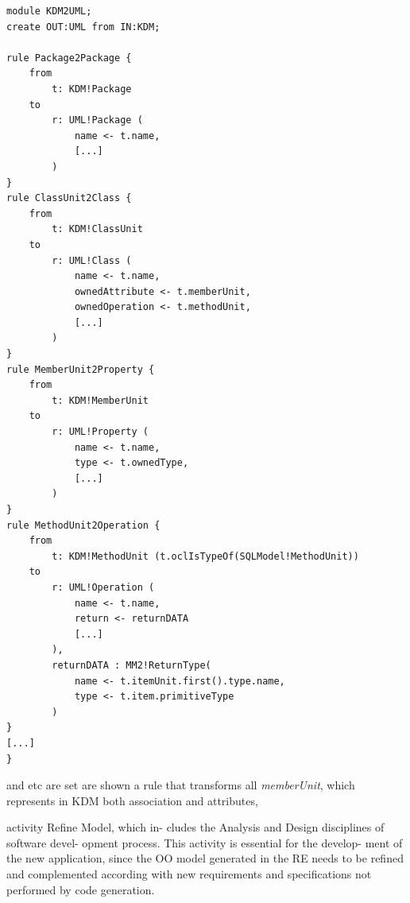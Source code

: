 \documentclass[a4paper,twoside]{article}
\newcommand*\circled[1]{\tikz[baseline=(char.base)]{
  \node[shape=circle,draw, inner sep=0.1pt] (char) {#1};}
}
\begin{document}
\begin{lstlisting}[caption=Chunk of KDM2UML, label=list:KDM2UML, frame=lrtb, basicstyle=\tiny]
module KDM2UML;
create OUT:UML from IN:KDM;

rule Package2Package {
	from 
		t: KDM!Package
	to
		r: UML!Package (	
			name <- t.name,
			[...]
		)
}
rule ClassUnit2Class {
	from
		t: KDM!ClassUnit
	to
		r: UML!Class (
			name <- t.name,
			ownedAttribute <- t.memberUnit,
			ownedOperation <- t.methodUnit,
			[...]
		)
}
rule MemberUnit2Property {
	from
		t: KDM!MemberUnit
	to
		r: UML!Property (
			name <- t.name,
			type <- t.ownedType,
			[...]
		)
}
rule MethodUnit2Operation {	
	from
		t: KDM!MethodUnit (t.oclIsTypeOf(SQLModel!MethodUnit))
	to
		r: UML!Operation (
			name <- t.name,
			return <- returnDATA
			[...]
		),
		returnDATA : MM2!ReturnType(
			name <- t.itemUnit.first().type.name,
			type <- t.item.primitiveType
		)
}
[...]
}
\end{lstlisting}


  and etc are set  are shown a rule that transforms all \textit{memberUnit}, which represents in KDM both association and attributes,      


  activity Refine Model, which in- cludes the Analysis and Design disciplines of software devel- opment process. This activity is essential for the develop- ment of the new application, since the OO model generated in the RE needs to be refined and complemented according with new requirements and specifications not performed by code generation.










\end{document}

